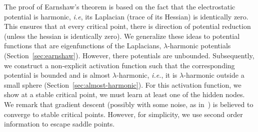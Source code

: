 
The proof of Earnshaw's theorem is based on the fact that the electrostatic potential is harmonic, \emph{i.e}, its Laplacian (trace of its Hessian) is identically zero. This ensures that at every critical point, there is direction of potential reduction (unless the hessian is identically zero). We generalize these ideas to potential functions that are eigenfunctions of the Laplacians, $\lambda$-harmonic potentials (Section~\ref{sec:earnshaw}). However, there potentials are unbounded. Subsequently, we construct a non-explicit activation function such that the corresponding potential is bounded and is almost $\lambda$-harmonic, \emph{i.e.}, it is $\lambda$-harmonic outside a small sphere (Section~\ref{sec:almost-harmonic}). For this activation function, we show at a stable critical point, we must learn at least one of the hidden nodes. We remark that gradient descent (possibly with some noise, as in~\cite{GeHJY15}) is believed to converge to stable critical points. However, for simplicity, we use second order information to escape saddle points.




